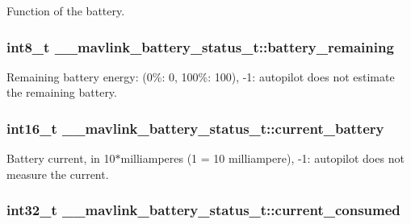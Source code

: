 Function of the battery. 

\hypertarget{struct____mavlink__battery__status__t_aa2aa73e1a73123460a4da3e3918ca434}{
\subsubsection[{battery\+\_\+remaining}]{\setlength{\rightskip}{0pt plus 5cm}int8\+\_\+t \+\_\+\+\_\+mavlink\+\_\+battery\+\_\+status\+\_\+t\+::battery\+\_\+remaining}}\label{struct____mavlink__battery__status__t_aa2aa73e1a73123460a4da3e3918ca434}


Remaining battery energy\+: (0\%\+: 0, 100\%\+: 100), -\/1\+: autopilot does not estimate the remaining battery. 

\hypertarget{struct____mavlink__battery__status__t_a1577349498c9881468031a20cd2faeae}{
\subsubsection[{current\+\_\+battery}]{\setlength{\rightskip}{0pt plus 5cm}int16\+\_\+t \+\_\+\+\_\+mavlink\+\_\+battery\+\_\+status\+\_\+t\+::current\+\_\+battery}}\label{struct____mavlink__battery__status__t_a1577349498c9881468031a20cd2faeae}


Battery current, in 10$\ast$milliamperes (1 = 10 milliampere), -\/1\+: autopilot does not measure the current. 

\hypertarget{struct____mavlink__battery__status__t_ac1a47c138e4bc2bb4788dce4f09016ff}{
\subsubsection[{current\+\_\+consumed}]{\setlength{\rightskip}{0pt plus 5cm}int32\+\_\+t \+\_\+\+\_\+mavlink\+\_\+battery\+\_\+status\+\_\+t\+::current\+\_\+consumed}}\label{struct____mavlink__battery__status__t_ac1a47c138e4bc2bb4788dce4f09016ff}


